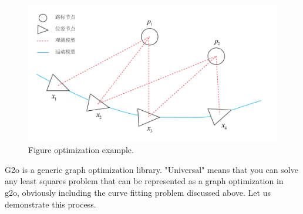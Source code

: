 \begin{figure}[!ht]
	\centering
	\includegraphics[width=1.0\textwidth]{chapter06/optimization/graphOptimization.pdf}
	\caption{Figure optimization example. }
	\label{fig:graph-optimization}
\end{figure}

G2o is a generic graph optimization library. "Universal" means that you can solve any least squares problem that can be represented as a graph optimization in g2o, obviously including the curve fitting problem discussed above. Let us demonstrate this process.
